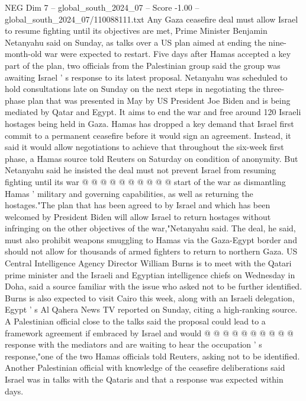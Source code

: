 \begin{textsample}{NEG Dim 7 – global\_south\_2024\_07 – Score -1.00 – global\_south\_2024\_07/110088111.txt}  \label{ex:f7_neg_346}
Any Gaza ceasefire deal must allow Israel to resume fighting until its objectives are met, Prime Minister Benjamin Netanyahu said on Sunday, as talks over a US plan aimed at ending the nine-month-old war were expected to restart.
Five days after Hamas accepted a key part of the plan, two officials from the Palestinian group said the group was awaiting Israel ' s response to its latest proposal.
Netanyahu was scheduled to hold consultations late on Sunday on the next steps in negotiating the three-phase plan that was presented in May by US President Joe Biden and is being mediated by Qatar and Egypt.
It aims to end the war and free around 120 Israeli hostages being held in Gaza.
Hamas has dropped a key demand that Israel first commit to a permanent ceasefire before it would sign an agreement.
Instead, it said it would allow negotiations to achieve that throughout the six-week first phase, a Hamas source told Reuters on Saturday on condition of anonymity.
But Netanyahu said he insisted the deal must not prevent Israel from resuming fighting until its war @ @ @ @ @ @ @ @ @ @ start of the war as dismantling Hamas ' military and governing capabilities, as well as returning the hostages."The plan that has been agreed to by Israel and which has been welcomed by President Biden will allow Israel to return hostages without infringing on the other objectives of the war,"Netanyahu said.
The deal, he said, must also prohibit weapons smuggling to Hamas via the Gaza-Egypt border and should not allow for thousands of armed fighters to return to northern Gaza.
US Central Intelligence Agency Director William Burns is to meet with the Qatari prime minister and the Israeli and Egyptian intelligence chiefs on Wednesday in Doha, said a source familiar with the issue who asked not to be further identified.
Burns is also expected to visit Cairo this week, along with an Israeli delegation, Egypt ' s Al Qahera News TV reported on Sunday, citing a high-ranking source.
A Palestinian official close to the talks said the proposal could lead to a framework agreement if embraced by Israel and would @ @ @ @ @ @ @ @ @ @ response with the mediators and are waiting to hear the occupation ' s response,"one of the two Hamas officials told Reuters, asking not to be identified.
Another Palestinian official with knowledge of the ceasefire deliberations said Israel was in talks with the Qataris and that a response was expected within days.

\end{textsample}
